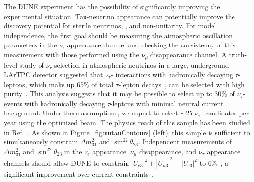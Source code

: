 The DUNE experiment has the possibility of significantly improving the experimental situation. Tau-neutrino appearance can potentially improve the discovery potential for sterile neutrinos,  , and non-unitarity.  For model independence, the first goal should be measuring the atmospheric oscillation parameters in the $\nu_{\tau}$ appearance channel and checking the consistency of this measurement with those performed using the $\nu_{\mu}$ disappearance channel.  A truth-level study of $\nu_{\tau}$ selection in atmospheric neutrinos in a large, underground LArTPC detector suggested that $\nu_{\tau}$- interactions with hadronically decaying $\tau$-leptons, which make up 65\% of total $\tau$-lepton decays~\cite{Tanabashi:2018oca}, can be selected with high purity~\cite{Conrad:1008}.  This analysis suggests that it may be possible to select up to 30\% of $\nu_{\tau}$- events with hadronically decaying $\tau$-leptons with minimal neutral current background.  Under these assumptions, we expect to select $\sim$25 $\nu_{\tau}$- candidates per year using the  optimized beam. The physics reach of this sample has been studied in Ref.~\cite{deGouvea:2019ozk}. As shown in Figure~\ref{fig:nutauContours} (left), this sample is sufficient to simultaneously constrain $\Delta m^2_{31}$ and $\sin^22\theta_{23}$. Independent measurements of $\Delta m^2_{31}$ and $\sin^22\theta_{23}$ in the $\nu_{e}$ appearance, $\nu_{\mu}$ disappearance, and $\nu_{\tau}$ appearance channels should allow DUNE to constrain $|U_{e3}|^2+|U_{\mu 3}|^2+|U_{\tau 3}|^2$ to 6\%~\cite{deGouvea:2019ozk}, a significant improvement over current constraints~\cite{Parke:2015goa}.

